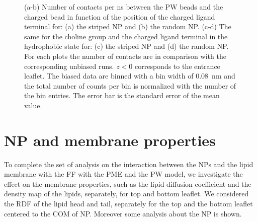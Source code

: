 \begin{figure}[h!]
{		}
		\caption{(a-b) Number of contacts per ns between the \acs{PW} beads and the charged bead in function of the position of the charged ligand terminal for: (a) the striped \acs{NP} and (b) the random \acs{NP}. (c-d) The same for the choline group and the charged ligand terminal in the hydrophobic state for: (c) the striped \ac{NP} and (d) the random \acs{NP}. For each plots the number of contacts are in comparison with the corresponding unbiased runs.  $z<0$ corresponds to the entrance leaflet. The biased data are binned with a bin width of $0.08$~nm and the total number of counts per bin is normalized with the number of the bin entries. The error bar is the standard error of the mean value.}%
		\label{fig:contactsUn}
\end{figure}

\newpage
\section{NP and membrane properties}
To complete the set of analysis on the interaction between the \acp{NP} and the lipid membrane with the \martini \ac{FF} with the \ac{PME} and the \ac{PW} model, we investigate the effect on the membrane properties, such as the lipid diffusion coefficient and the density map of the lipids, separately, for top and bottom leaflet. We considered the \ac{RDF} of the lipid head and tail, separately for the top and the bottom leaflet centered to the \ac{COM} of \ac{NP}. Moreover some analysis about the \ac{NP} is shown.

